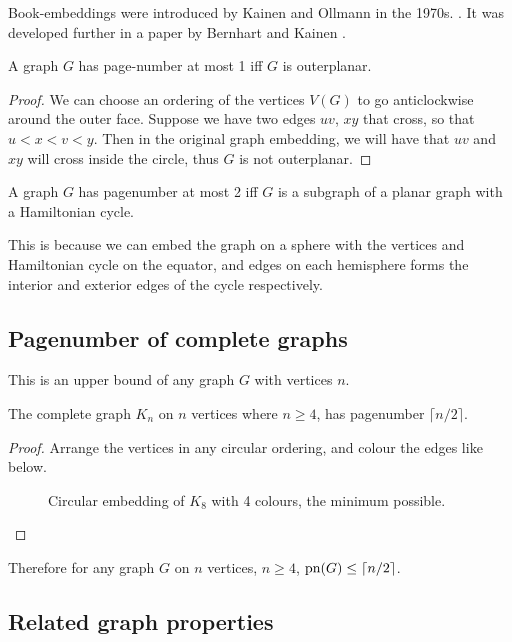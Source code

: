 Book-embeddings were introduced by Kainen and Ollmann in the 1970s. \cite{kainenRecentResultsTopological1974, ollmannBookThicknessVarious1973}. It was developed further in a paper by Bernhart and Kainen \cite{bernhartBookThicknessGraph1979}. 
\begin{lemma}\label{lem:Pagenumber_1}
	A graph $G$ has page-number at most 1 iff $G$ is outerplanar.
\end{lemma}
\begin{proof}
	We can choose an ordering of the vertices $V(G)$ to go anticlockwise around the outer face. Suppose we have two edges $uv$, $xy$ that cross, so that $u < x < v < y$. Then in the original graph embedding, we will have that $uv$ and $xy$ will cross inside the circle, thus $G$ is not outerplanar. 
\end{proof}
\begin{lemma}\label{lem:Pagenumber_2}
	A graph $G$ has pagenumber at most 2 iff $G$ is a subgraph of a planar graph with a Hamiltonian cycle.
\end{lemma}
This is because we can embed the graph on a sphere with the vertices and Hamiltonian cycle on the equator, and edges on each hemisphere forms the interior and exterior edges of the cycle respectively.

\subsection{Pagenumber of complete graphs}\label{ssec:Pagenumber_Complete_Graphs}
This is an upper bound of any graph $G$ with vertices $n$. 
\begin{theorem}\label{thm:Pagenumber_Complete_Graph}
	The complete graph $K_n$ on $n$ vertices where $n \geq 4$, has pagenumber $\lceil n/2 \rceil$. 
\end{theorem}
\begin{proof}
	Arrange the vertices in any circular ordering, and colour the edges like below.
	\begin{figure}[h]
		\caption{Circular embedding of $K_8$ with 4 colours, the minimum possible.}
		\centering
		
		\label{fig:k8 coloured with colours}
	\end{figure}
\end{proof}
Therefore for any graph $G$ on $n$ vertices, $n \geq 4$, $\text{pn}(G) \leq \lceil n/2 \rceil$. 
\subsection{Related graph properties}\label{ssec:Related_Properties}

